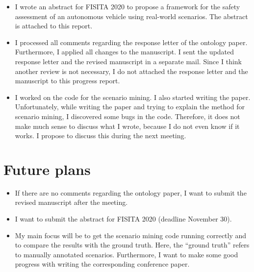 \documentclass[10pt,final,a4paper,oneside,onecolumn]{article}
\begin{document}
\begin{itemize}
	\item I wrote an abstract for FISITA 2020 to propose a framework for the safety assessment of an autonomous vehicle using real-world scenarios. The abstract is attached to this report.
	\item I processed all comments regarding the response letter of the ontology paper. Furthermore, I applied all changes to the manuscript. I sent the updated response letter and the revised manuscript in a separate mail. Since I think another review is not necessary, I do not attached the response letter and the manuscript to this progress report.
	\item I worked on the code for the scenario mining. I also started writing the paper. Unfortunately, while writing the paper and trying to explain the method for scenario mining, I discovered some bugs in the code. Therefore, it does not make much sense to discuss what I wrote, because I do not even know if it works. I propose to discuss this during the next meeting.
\end{itemize}

\section{Future plans}

\begin{itemize}
	\item If there are no comments regarding the ontology paper, I want to submit the revised manuscript after the meeting.
	\item I want to submit the abstract for FISITA 2020 (deadline November 30).
	\item My main focus will be to get the scenario mining code running correctly and to compare the results with the ground truth. Here, the ``ground truth'' refers to manually annotated scenarios. Furthermore, I want to make some good progress with writing the corresponding conference paper.
\end{itemize}


\clearpage

\end{document}
